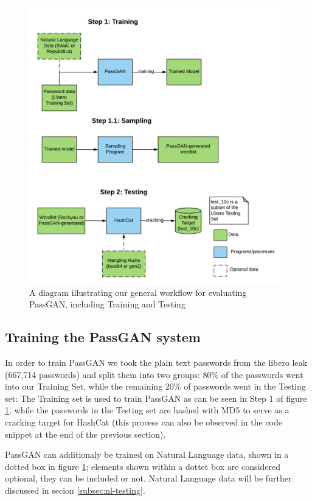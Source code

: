 \begin{figure}[H]
\centering
    \includegraphics[scale=0.8]{figures/testing_flowchart_fixed.png}
    \caption{A diagram illustrating our general workflow for evaluating PassGAN, including Training and Testing}
    \label{fig:testing_flowchart}
\end{figure}    

\subsection{Training the PassGAN system}
In order to train PassGAN we took the plain text passwords from the libero leak (667,714 passwords) and split them into two groups: 80\% of the passwords went into our Training Set, while the remaining 20\% of passwords went in the Testing set: The Training set is used to train PassGAN as can be seen in Step 1 of figure \ref{fig:testing_flowchart}, while the passwords in the Testing set are hashed with MD5 to serve as a cracking target for HashCat (this process can also be observed in the code snippet at the end of the previous section).

PassGAN can additionaly be trained on Natural Language data, shown in a dotted box in figure \ref{fig:testing_flowchart}; elements shown within a dottet box are considered optional, they can be included or not. Natural Language data will be further discussed in secion \ref{subsec:nl-testing}.

